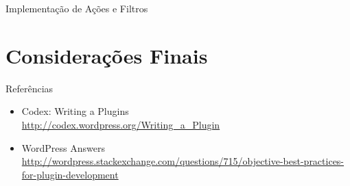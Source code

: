 \documentclass{beamer}
\begin{document}
\begin{frame}{Implementação de Ações e Filtros}
  
  \pause 
\end{frame}

































\section{Considerações Finais}

\begin{frame}{Referências}
\begin{itemize}
  \item Codex: Writing a Plugins \\
    \url{http://codex.wordpress.org/Writing_a_Plugin}
  \item WordPress Answers
    \url{http://wordpress.stackexchange.com/questions/715/objective-best-practices-for-plugin-development}
\end{itemize}
\end{frame}
\end{document}
